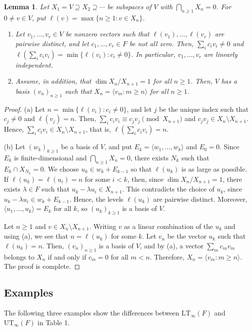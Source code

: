 \documentclass[11pt,reqno,a4paper]{amsart}
\numberwithin{equation}{section}
\newtheorem{lemma}[theorem]{Lemma}
\theoremstyle{definition}
\theoremstyle{plain}
\newcommand{\LT}{\mathrm{LT}_{\infty}}
\newcommand{\UT}{\mathrm{UT}_{\infty}}
\newcommand{\spann}[1]{\langle #1\rangle}
\begin{document}
\begin{lemma}
Let $X_1=V\supseteq X_2\supseteq\cdots$ be subspaces of $V$ with $\bigcap_{n\ge1}X_n=0$. For $0\ne v\in V$, put $\ell(v)=\max\{n\ge1:v\in X_n\}$.
\begin{enumerate}
\item[(a)] Let $v_1,\ldots,v_r\in V$ be nonzero vectors such that $\ell(v_1),\ldots,\ell(v_r)$ are pairwise distinct, and let $c_1,\ldots,c_r\in F$ be not all zero. Then, $\sum_i c_iv_i\ne0$ and $\ell(\sum_i c_iv_i)=\min\{\ell(v_i):c_i\ne0\}$. In particular, $v_1,\ldots,v_r$ are linearly independent.
\item[(b)] Assume, in addition, that $\dim X_n/X_{n+1}=1$ for all $n\ge1$. Then, $V$ has a basis $(v_n)_{n\ge1}$ such that $X_n=\spann{v_m:m\ge n}$ for all $n\ge1$.
\end{enumerate}
\end{lemma}
\begin{proof}
(a) Let $n=\min\{\ell(v_i):c_i\ne0\}$, and let $j$ be the unique index such that $c_j\ne0$ and $\ell(v_j)=n$. Then, $\sum_i c_iv_i\equiv c_jv_j\pmod{X_{n+1}}$ and $c_jv_j\in X_n\setminus X_{n+1}$. Hence, $\sum_i c_iv_i\in X_n\setminus X_{n+1}$, that is, $\ell(\sum_i c_iv_i)=n$.

(b) Let $(w_k)_{k\ge1}$ be a basis of $V$, and put $E_k=\spann{w_1,\ldots,w_k}$ and $E_0=0$. Since $E_k$ is finite-dimensional and $\bigcap_{n\ge1}X_n=0$, there exists $N_k$ such that $E_k\cap X_{N_k}=0$. We choose $u_k\in w_k+E_{k-1}$ so that $\ell(u_k)$ is as large as possible. If $\ell(u_k)=\ell(u_i)=n$ for some $i<k$, then, since $\dim X_n/X_{n+1}=1$, there exists $\lambda\in F$ such that $u_k-\lambda u_i\in X_{n+1}$. This contradicts the choice of $u_k$, since $u_k-\lambda u_i\in w_k+E_{k-1}$. Hence, the levels $\ell(u_k)$ are pairwise distinct. Moreover, $\spann{u_1,\ldots,u_k}=E_k$ for all $k$, so $(u_k)_{k\ge1}$ is a basis of $V$.

Let $n\ge1$ and $v\in X_n\setminus X_{n+1}$. Writing $v$ as a linear combination of the $u_k$ and using (a), we see that $n=\ell(u_k)$ for some $k$. Let $v_n$ be the vector $u_k$ such that $\ell(u_k)=n$. Then, $(v_n)_{n\ge1}$ is a basis of $V$, and by (a), a vector $\sum_m c_mv_m$ belongs to $X_n$ if and only if $c_m=0$ for all $m<n$. Therefore, $X_n=\spann{v_m:m\ge n}$. The proof is complete.
\end{proof}

\subsection{Examples}
The following three examples show the differences between $\LT(F)$ and $\UT(F)$ in Table 1.
\end{document}

